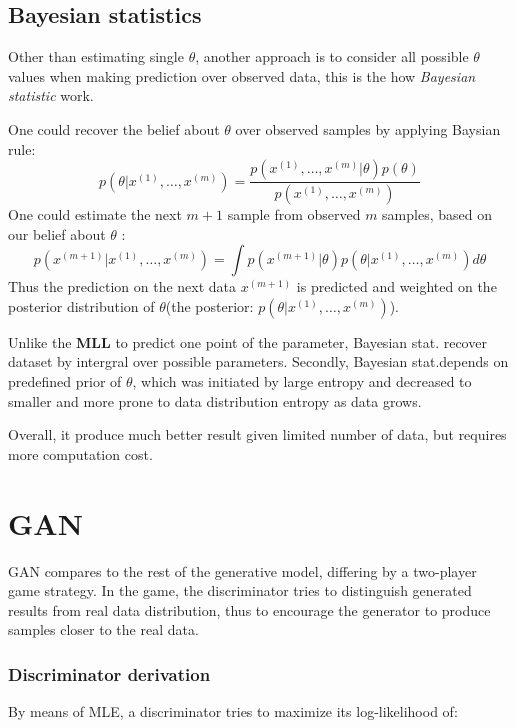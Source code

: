 \documentclass{article}
\begin{document}
\subsection*{Bayesian statistics}
Other than estimating single $\theta$, another approach is to consider all possible $\theta$ values when making prediction over observed data, this is the how \textit{Bayesian statistic} work. \par
One could recover the belief about $\theta$ over observed samples by applying Baysian rule:
\begin{equation}
    p(\theta|x^{(1)},\dots,x^{(m)}) = \frac{p(x^{(1)},\dots,x^{(m)}|\theta)p(\theta)}{p(x^{(1)},\dots,x^{(m)})}
\end{equation}
One could estimate the next $m+1$ sample from observed $m$ samples, based on our belief about $\theta$ :
\begin{equation}
    p(x^{(m+1)}|x^{(1)},\dots,x^{(m)}) = \int p(x^{(m+1)}|\theta)p(\theta|x^{(1)},\dots,x^{(m)})d\theta
\end{equation}
Thus the prediction on the next data $x^{(m+1)}$ is predicted and weighted on the posterior distribution of $\theta$(the posterior: $p(\theta|x^{(1)},\dots,x^{(m)})$).\par
Unlike the \textbf{MLL} to predict one point of the parameter, Bayesian stat. recover dataset by intergral over possible parameters. Secondly, Bayesian stat.depends on predefined prior of $\theta$, which was initiated by large entropy and decreased to smaller and more prone to data distribution entropy as data grows.\par
Overall, it produce much better result given limited number of data, but requires more computation cost.


\section{GAN}
GAN compares to the rest of the generative model, differing by a two-player game strategy. In the game, the discriminator tries to distinguish generated results from real data distribution, thus to encourage the generator to produce samples closer to the real data. \\
\subsubsection*{Discriminator derivation}
By means of MLE, a discriminator tries to maximize its log-likelihood of:
\end{document}
